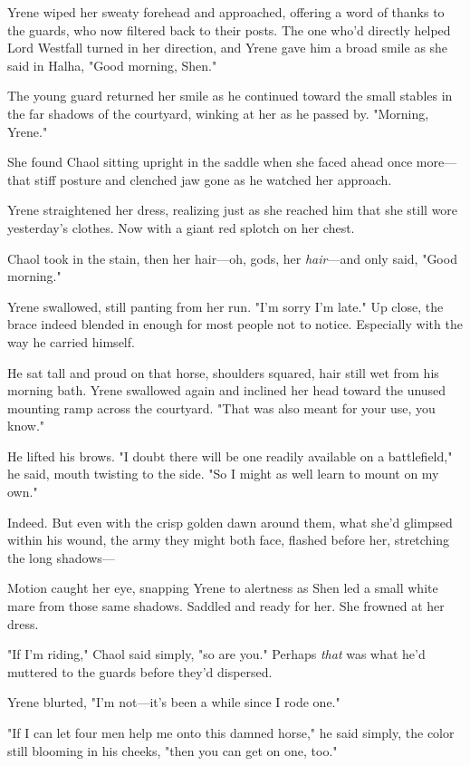 Yrene wiped her sweaty forehead and approached, offering a word of thanks to the guards, who now filtered back to their posts.
The one who'd directly helped Lord Westfall turned in her direction, and Yrene gave him a broad smile as she said in Halha, "Good morning, Shen."

The young guard returned her smile as he continued toward the small stables in the far shadows of the courtyard, winking at her as he passed by.
"Morning, Yrene."

She found Chaol sitting upright in the saddle when she faced ahead once more---that stiff posture and clenched jaw gone as he watched her approach.

Yrene straightened her dress, realizing just as she reached him that she still wore yesterday's clothes.
Now with a giant red splotch on her chest.

Chaol took in the stain, then her hair---oh, gods, her \emph{hair}---and only said, "Good morning."

Yrene swallowed, still panting from her run.
"I'm sorry I'm late."
Up close, the brace indeed blended in enough for most people not to notice.
Especially with the way he carried himself.

He sat tall and proud on that horse, shoulders squared, hair still wet from his morning bath.
Yrene swallowed again and inclined her head toward the unused mounting ramp across the courtyard.
"That was also meant for your use, you know."

He lifted his brows.
"I doubt there will be one readily available on a battlefield," he said, mouth twisting to the side.
"So I might as well learn to mount on my own."

Indeed.
But even with the crisp golden dawn around them, what she'd glimpsed within his wound, the army they might both face, flashed before her, stretching the long shadows---

Motion caught her eye, snapping Yrene to alertness as Shen led a small white mare from those same shadows.
Saddled and ready for her.
She frowned at her dress.

"If I'm riding," Chaol said simply, "so are you."
Perhaps \emph{that} was what he'd muttered to the guards before they'd dispersed.

Yrene blurted, "I'm not---it's been a while since I rode one."

"If I can let four men help me onto this damned horse," he said simply, the color still blooming in his cheeks, "then you can get on one, too."

